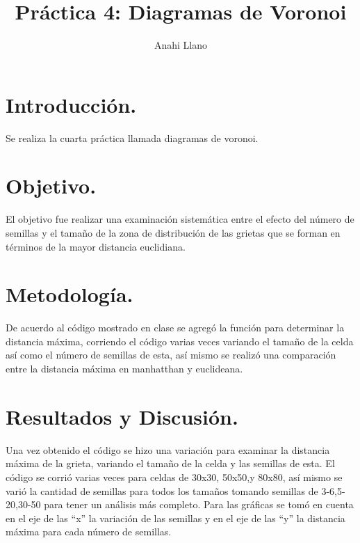\documentclass{article}
\title{Pr\'actica 4: Diagramas de Voronoi}
\author{Anahi Llano}
\begin{document}
\maketitle

\section{Introducci\'{o}n.}\label{into}

Se realiza la cuarta pr\'actica \cite{elisa} llamada diagramas de voronoi.

 \section{Objetivo.}\label{obj}

El objetivo fue realizar una examinaci\'on sistem\'atica entre el efecto del n\'umero de semillas y el tama\~no de la zona de distribuci\'on de las grietas que se forman en t\'erminos de la mayor distancia euclidiana.


\section{Metodolog\'{i}a.}\label{met}

De acuerdo al c\'odigo mostrado en clase \citet{elisa1} se agreg\'o la funci\'on para determinar la distancia m\'axima, corriendo el c\'odigo varias veces variando el tama\~no de la celda as\'i como el n\'umero de semillas de esta, as\'i mismo se realiz\'o una comparaci\'on entre la distancia m\'axima en manhatthan y euclideana.

\section{Resultados y Discusi\'{o}n.}\label{res}

Una vez obtenido el c\'odigo\citep{ana} se hizo una variaci\'on para examinar la distancia m\'axima de la grieta, variando el tama\~no de la celda y las semillas de esta. 
El c\'odigo se corri\'o varias veces para celdas de 30x30, 50x50,y 80x80, as\'i mismo se vari\'o la cantidad de semillas para todos los tama\~nos tomando semillas de 3-6,5-20,30-50 para tener un an\'alisis m\'as completo.
Para las gr\'aficas se tom\'o en cuenta en el eje de las ``x''  la variaci\'on de las semillas y en el eje de las ``y''  la distancia m\'axima para cada n\'umero de semillas.
\end{document}
